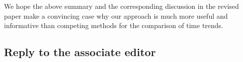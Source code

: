 \documentclass[a4paper,12pt]{article}
\begin{document}
\begin{enumerate}[label=\arabic*.,leftmargin=0.6cm]
\begin{enumerate}[leftmargin=0.7cm]

\end{enumerate}  
We hope the above summary and the corresponding discussion in the revised paper make a convincing case why our approach is much more useful and informative than competing methods for the comparison of time trends. 


\end{enumerate}



\subsection*{Reply to the associate editor}
\end{document}
